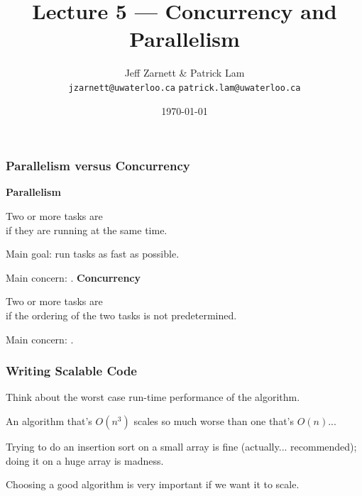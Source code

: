 

\title{Lecture 5 --- Concurrency and Parallelism }

\author{Jeff Zarnett \& Patrick Lam \\ \small \texttt{jzarnett@uwaterloo.ca} \texttt{patrick.lam@uwaterloo.ca}}
\date{\today}




\begin{frame}
  \titlepage

 \end{frame}

\begin{frame}
  \frametitle{Parallelism versus Concurrency}

  {\bf Parallelism}

  Two or more tasks are \\ \hspace*{2em} if they are running at the same time. 

  Main goal: run tasks as fast as possible. 

  Main concern: .
  \vfill
  {\bf Concurrency}

  Two or more tasks are \\ \hspace*{2em} if the ordering of the two tasks is not 
  predetermined. 

  Main concern: .

\end{frame}




\begin{frame}
\frametitle{Writing Scalable Code}

Think about the worst case run-time performance of the algorithm. 

An algorithm that's $O(n^{3})$ scales so much worse than one that's $O(n)$... 

Trying to do an insertion sort on a small array is fine (actually... recommended); doing it on a huge array is madness.

Choosing a good algorithm is very important if we want it to scale. 

\end{frame}

